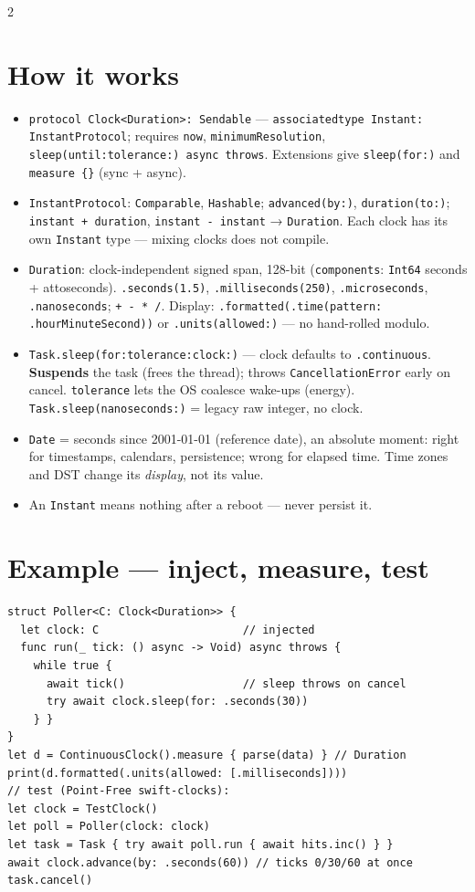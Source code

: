 \documentclass[8pt]{extarticle}
\begin{document}
\begin{multicols}{2}
\raggedright

\section{How it works}
\begin{itemize}
  \item \texttt{protocol Clock<Duration>: Sendable} — \texttt{associatedtype Instant:
        InstantProtocol}; requires \texttt{now}, \texttt{minimumResolution},
        \texttt{sleep(until:tolerance:) async throws}. Extensions give
        \texttt{sleep(for:)} and \texttt{measure \{\}} (sync + async).
  \item \texttt{InstantProtocol}: \texttt{Comparable}, \texttt{Hashable};
        \texttt{advanced(by:)}, \texttt{duration(to:)}; \texttt{instant + duration},
        \texttt{instant - instant} → \texttt{Duration}. Each clock has its own
        \texttt{Instant} type — mixing clocks does not compile.
  \item \texttt{Duration}: clock-independent signed span, 128-bit
        (\texttt{components}: \texttt{Int64} seconds + attoseconds).
        \texttt{.seconds(1.5)}, \texttt{.milliseconds(250)}, \texttt{.microseconds},
        \texttt{.nanoseconds}; \texttt{+ - * /}. Display:
        \texttt{.formatted(.time(pattern: .hourMinuteSecond))} or
        \texttt{.units(allowed:)} — no hand-rolled modulo.
  \item \texttt{Task.sleep(for:tolerance:clock:)} — clock defaults to
        \texttt{.continuous}. \textbf{Suspends} the task (frees the thread); throws
        \texttt{CancellationError} early on cancel. \texttt{tolerance} lets the OS
        coalesce wake-ups (energy). \texttt{Task.sleep(nanoseconds:)} = legacy raw
        integer, no clock.
  \item \texttt{Date} = seconds since 2001-01-01 (reference date), an absolute moment:
        right for timestamps, calendars, persistence; wrong for elapsed time. Time
        zones and DST change its \emph{display}, not its value.
  \item An \texttt{Instant} means nothing after a reboot — never persist it.
\end{itemize}

\section{Example — inject, measure, test}
\begin{lstlisting}[language=SwiftSheet]
struct Poller<C: Clock<Duration>> {
  let clock: C                      // injected
  func run(_ tick: () async -> Void) async throws {
    while true {
      await tick()                  // sleep throws on cancel
      try await clock.sleep(for: .seconds(30))
    } }
}
let d = ContinuousClock().measure { parse(data) } // Duration
print(d.formatted(.units(allowed: [.milliseconds])))
// test (Point-Free swift-clocks):
let clock = TestClock()
let poll = Poller(clock: clock)
let task = Task { try await poll.run { await hits.inc() } }
await clock.advance(by: .seconds(60)) // ticks 0/30/60 at once
task.cancel()
\end{lstlisting}


\end{multicols}
\end{document}
